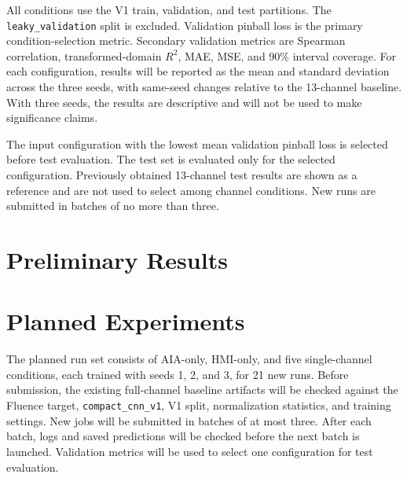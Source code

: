 \documentclass[12pt]{report}
\begin{document}
All conditions use the V1 train, validation, and test partitions. The \texttt{leaky\_validation} split is excluded. Validation pinball loss is the primary condition-selection metric. Secondary validation metrics are Spearman correlation, transformed-domain $R^2$, MAE, MSE, and 90\% interval coverage. For each configuration, results will be reported as the mean and standard deviation across the three seeds, with same-seed changes relative to the 13-channel baseline. With three seeds, the results are descriptive and will not be used to make significance claims.

The input configuration with the lowest mean validation pinball loss is selected before test evaluation. The test set is evaluated only for the selected configuration. Previously obtained 13-channel test results are shown as a reference and are not used to select among channel conditions. New runs are submitted in batches of no more than three.

\section{Preliminary Results}


\section{Planned Experiments}

The planned run set consists of AIA-only, HMI-only, and five single-channel conditions, each trained with seeds 1, 2, and 3, for 21 new runs. Before submission, the existing full-channel baseline artifacts will be checked against the Fluence target, \texttt{compact\_cnn\_v1}, V1 split, normalization statistics, and training settings. New jobs will be submitted in batches of at most three. After each batch, logs and saved predictions will be checked before the next batch is launched. Validation metrics will be used to select one configuration for test evaluation.
\end{document}
